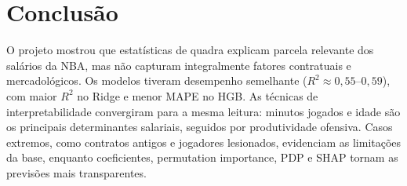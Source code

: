 \documentclass[11pt]{article}
\begin{document}
\section{Conclusão}

O projeto mostrou que estatísticas de quadra explicam parcela relevante dos salários da NBA, mas não capturam integralmente fatores contratuais e mercadológicos. Os modelos tiveram desempenho semelhante ($R^2 \approx 0{,}55$--$0{,}59$), com maior $R^2$ no Ridge e menor MAPE no HGB. As técnicas de interpretabilidade convergiram para a mesma leitura: minutos jogados e idade são os principais determinantes salariais, seguidos por produtividade ofensiva. Casos extremos, como contratos antigos e jogadores lesionados, evidenciam as limitações da base, enquanto coeficientes, permutation importance, PDP e SHAP tornam as previsões mais transparentes.
\end{document}
